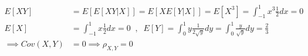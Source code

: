 \documentclass[12pt]{article}
\begin{document}
\begin{qsolve}[solution]
\begin{qsolve}[]
\begin{align*}
            E[XY]             & = E[E[XY|X]] = E[XE[Y|X]] = E[X^3] = \int_{-1}^{1} x^3\frac{1}{2}dx = 0                                                                                                                                          \\
            E[X]              & = \int_{-1}^{1} x\frac{1}{2}dx = 0                                                      \;\; , \; \;           E[Y]      = \int_{0}^{1} y\frac{1}{2\sqrt{y}}dy = \int_{0}^{1} \frac{y}{\sqrt{y}}dy = \frac{2}{3} \\
            \implies Cov(X,Y) & = 0 \implies \rho_{X,Y} = 0                                                                                                                                                                                      \\
        \end{align*}
    \end{qsolve}
\end{qsolve}
\end{document}
